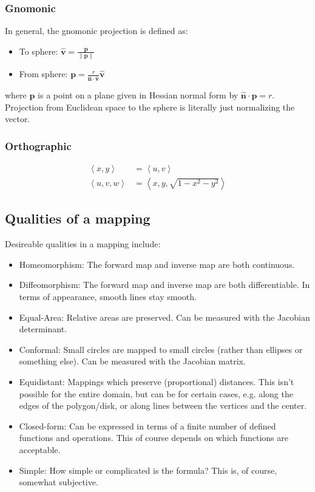 \documentclass{amsart}[12pt]
\begin{document}
\subsubsection{Gnomonic}
In general, the gnomonic projection is defined as:
\begin{itemize}
\item To sphere: $\hat{\mathbf v} = \frac{\mathbf p}{\|\mathbf p\|}$
\item From sphere: $\mathbf p = \frac{r}
  {\hat{\mathbf n} \cdot \hat{\mathbf v}}\hat{\mathbf v}$
\end{itemize}
where $\mathbf p$ is a point on a plane given in Hessian normal
form by $\hat{\mathbf n} \cdot \mathbf p = r$. Projection from Euclidean
space to the sphere is literally just normalizing the vector.

\subsubsection{Orthographic}
\begin{equation}\begin{split}
  \left<x, y\right> &= \left<u, v\right> \\
  \left<u, v, w\right> &= \left<x, y, \sqrt{1-x^2-y^2}\right>
\end{split}\end{equation}

\subsection{Qualities of a mapping}

Desireable qualities in a mapping include:
\begin{itemize}
\item Homeomorphism: The forward map and inverse map are both continuous.
\item Diffeomorphism: The forward map and inverse map are both differentiable.
In terms of appearance, smooth lines stay smooth.
\item Equal-Area: Relative areas are preserved.
  Can be measured with the Jacobian determinant.
\item Conformal: Small circles are mapped to small circles
(rather than ellipses or something else). Can be measured with the Jacobian matrix.
\item Equidistant: Mappings which preserve (proportional) distances. This isn't
possible for the entire domain, but can be for certain cases, e.g. along the
edges of the polygon/disk, or along lines between the vertices and the center.
\item Closed-form: Can be expressed in terms of a finite number of defined
functions and operations.
This of course depends on which functions are acceptable.
\item Simple: How simple or complicated is the formula? This is,
of course, somewhat subjective.
\end{itemize}
\end{document}

